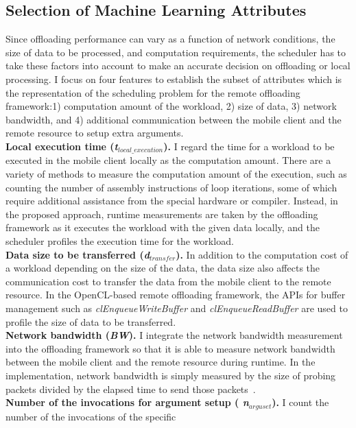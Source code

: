 \subsection{Selection of Machine Learning Attributes}
\label{scheduler:attributes}
%
Since offloading performance can vary as a function of network
conditions, the size of data to be processed, and computation
requirements, the scheduler has to take these factors into account to
make an accurate decision on offloading or local processing.
%
I focus on four features to establish the subset of attributes which is
the representation of the scheduling problem for the remote offloading
framework:1) computation amount of the workload, 2) size of data, 3)
network bandwidth, and 4) additional communication between the mobile
client and the remote resource to setup extra arguments.\\
%
{\bf Local execution time ({\it {t$_{local\_execution}$}}).} I regard the
time for a workload to be executed in the mobile client locally as the
computation amount.
%
There are a variety of methods to measure the computation amount of the
execution, such as counting the number of assembly instructions of loop
iterations, some of which require additional assistance from the
special hardware or compiler.
%
Instead, in the proposed approach, runtime measurements are taken by the
offloading framework as it executes the workload with the given data
locally, and the scheduler profiles the execution time for the
workload.\\
%
{\bf Data size to be transferred ({\it {d$_{transfer}$}}).} In addition
to the computation cost of a workload depending on the size of the data,
the data size also affects the communication cost to transfer the data
from the mobile client to the remote resource.
%
In the OpenCL-based remote offloading framework, the APIs for buffer
management such as {\it clEnqueueWriteBuffer} and {\it
clEnqueueReadBuffer} are used to profile the size of data to be
transferred.\\
%
{\bf Network bandwidth ({\it BW}).} I integrate the network bandwidth
measurement into the offloading framework so that it is able to measure
network bandwidth between the mobile client and the remote resource
during runtime.
%
In the implementation, network bandwidth is simply measured by the size
of probing packets divided by the elapsed time to send those
packets~\cite{bandwidth}.\\
%
{\bf Number of the invocations for argument setup ({\it
{n$_{arguset}$}}).} I count the number of the invocations of the specific
